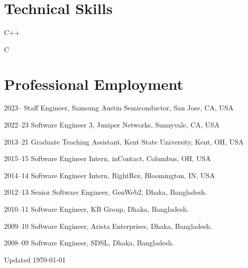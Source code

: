 \documentclass[11pt,letterpaper]{report}
\newcommand{\listitemspace}{0.25em}
\renewenvironment{itemize}
{\begin{list}{}{\setlength{\leftmargin}{0em}
                \setlength{\parskip}{0em}
                \setlength{\itemsep}{\listitemspace}
                \setlength{\parsep}{\listitemspace}}}
{\end{list}}
\begin{document}
    \section*{Technical Skills}

\begin{itemize}
	\item C++ 
	\item C
\end{itemize}


    \section*{Professional Employment}

    \begin{tablist}
        \item[2023--] \tab{}Staff Engineer, Samsung Austin Semiconductor, San Jose, CA, USA
        \item[2022--23] \tab{}Software Engineer 3, Juniper Networks, Sunnyvale, CA, USA
        \item[2013--21] \tab{}Graduate Teaching Assistant, Kent State University, Kent, OH, USA
        \item[2015--15] \tab{}Software Engineer Intern, inContact, Columbus, OH, USA
        \item[2014--14] \tab{}Software Engineer Intern, RightRez, Bloomington, IN, USA
        \item[2012--13] \tab{}Senior Software Engineer, GenWeb2, Dhaka, Bangladesh.
        \item[2010--11] \tab{}Software Engineer, KB Group, Dhaka, Bangladesh.
        \item[2009--10] \tab{}Software Engineer, Arista Enterprises, Dhaka, Bangladesh.
        \item[2008--09] \tab{}Software Engineer, SDSL, Dhaka, Bangladesh.
                
    \end{tablist}



    \begin{center}
        \vfill
        Updated \monthyeardate\today
    \end{center}
\end{document}
